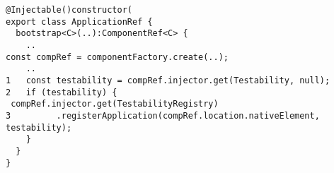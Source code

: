 \begin{verbatim}
@Injectable()constructor(
export class ApplicationRef {
  bootstrap<C>(..):ComponentRef<C> {
    ..
const compRef = componentFactory.create(..);
    ..
1   const testability = compRef.injector.get(Testability, null);
2   if (testability) {
 compRef.injector.get(TestabilityRegistry)
3         .registerApplication(compRef.location.nativeElement, testability);
    }
  }
}
\end{verbatim}
